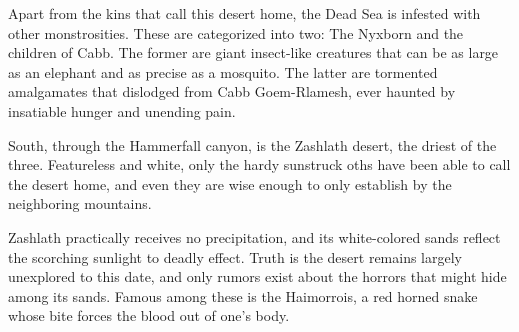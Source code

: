 Apart from the kins that call this desert home, the Dead Sea is infested with other monstrosities.
These are categorized into two: The Nyxborn and the children of Cabb.
The former are giant insect-like creatures that can be as large as an elephant and as precise as a mosquito.
The latter are tormented amalgamates that dislodged from Cabb Goem-Rlamesh, ever haunted by insatiable hunger and unending pain.


South, through the Hammerfall canyon, is the Zashlath desert, the driest of the three.
Featureless and white, only the hardy sunstruck oths have been able to call the desert home, and even they are wise enough to only establish by the neighboring mountains.

Zashlath practically receives no precipitation, and its white-colored sands reflect the scorching sunlight to deadly effect.
Truth is the desert remains largely unexplored to this date, and only rumors exist about the horrors that might hide among its sands.
Famous among these is the Haimorrois, a red horned snake whose bite forces the blood out of one's body.
